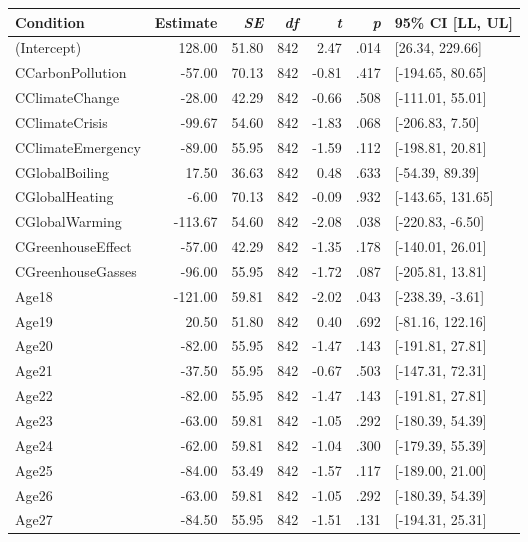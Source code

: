 \begin{table}[ht]
\centering
\begin{tabular}{lrrrrrl}
  \hline
Condition & Estimate & \textit{SE} & \textit{df} & \textit{t} & \textit{p} & 95\% CI [LL, UL] \\ 
  \hline
(Intercept) & 128.00 & 51.80 & 842 & 2.47 & .014 & [26.34, 229.66] \\ 
  CCarbonPollution & -57.00 & 70.13 & 842 & -0.81 & .417 & [-194.65, 80.65] \\ 
  CClimateChange & -28.00 & 42.29 & 842 & -0.66 & .508 & [-111.01, 55.01] \\ 
  CClimateCrisis & -99.67 & 54.60 & 842 & -1.83 & .068 & [-206.83, 7.50] \\ 
  CClimateEmergency & -89.00 & 55.95 & 842 & -1.59 & .112 & [-198.81, 20.81] \\ 
  CGlobalBoiling & 17.50 & 36.63 & 842 & 0.48 & .633 & [-54.39, 89.39] \\ 
  CGlobalHeating & -6.00 & 70.13 & 842 & -0.09 & .932 & [-143.65, 131.65] \\ 
  CGlobalWarming & -113.67 & 54.60 & 842 & -2.08 & .038 & [-220.83, -6.50] \\ 
  CGreenhouseEffect & -57.00 & 42.29 & 842 & -1.35 & .178 & [-140.01, 26.01] \\ 
  CGreenhouseGasses & -96.00 & 55.95 & 842 & -1.72 & .087 & [-205.81, 13.81] \\ 
  Age18 & -121.00 & 59.81 & 842 & -2.02 & .043 & [-238.39, -3.61] \\ 
  Age19 & 20.50 & 51.80 & 842 & 0.40 & .692 & [-81.16, 122.16] \\ 
  Age20 & -82.00 & 55.95 & 842 & -1.47 & .143 & [-191.81, 27.81] \\ 
  Age21 & -37.50 & 55.95 & 842 & -0.67 & .503 & [-147.31, 72.31] \\ 
  Age22 & -82.00 & 55.95 & 842 & -1.47 & .143 & [-191.81, 27.81] \\ 
  Age23 & -63.00 & 59.81 & 842 & -1.05 & .292 & [-180.39, 54.39] \\ 
  Age24 & -62.00 & 59.81 & 842 & -1.04 & .300 & [-179.39, 55.39] \\ 
  Age25 & -84.00 & 53.49 & 842 & -1.57 & .117 & [-189.00, 21.00] \\ 
  Age26 & -63.00 & 59.81 & 842 & -1.05 & .292 & [-180.39, 54.39] \\ 
  Age27 & -84.50 & 55.95 & 842 & -1.51 & .131 & [-194.31, 25.31] \\ 

\end{tabular}
\end{table}

